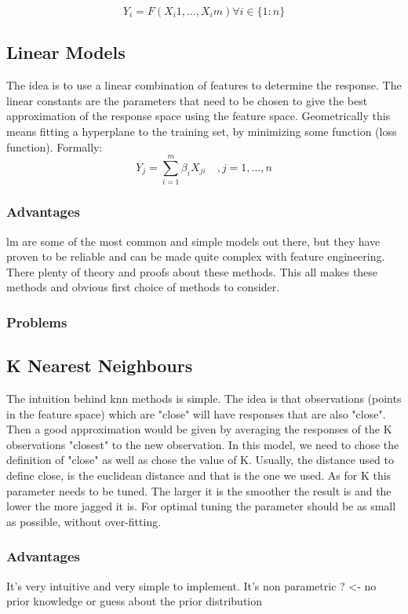 $$
Y_i = F(X_i1,\dots,X_im) \forall i \in \{1:n\}
$$


\subsection{Linear Models}
The idea is to use a linear combination of features to determine the response. The linear constants are the parameters that need to be chosen to give the best approximation of the response space using the feature space. Geometrically this means fitting a hyperplane to the training set, by minimizing some function (loss function).
Formally:
$$
Y_j = \sum_{i=1}^m \beta_{i} X_{ji} \quad, j=1,\dots,n
$$

\subsubsection{Advantages}
\acrlong{lm} are some of the most common and simple models out there, but they have proven to be reliable and can be made quite complex with feature engineering. There plenty of theory and proofs about these methods. This all makes these methods and obvious first choice of methods to consider.
\subsubsection{Problems}


\subsection{K Nearest Neighbours}
The intuition behind \acrshort{knn} methods is simple. The idea is that observations (points in the feature space) which are "close" will have responses that are also "close". Then a good approximation would be given by averaging the responses of the K observations "closest" to the new observation.
In this model, we need to chose the definition of "close" as well as chose the value of K.
Usually, the distance used to define close, is the euclidean distance and that is the one we used. As for K this parameter needs to be tuned. The larger it is the smoother the result is and the lower the more jagged it is. For optimal tuning the parameter should be as small as possible, without over-fitting.
\subsubsection{Advantages}
It's very intuitive and very simple to implement. 
It's non parametric ? <- no prior knowledge or guess about the prior distribution
